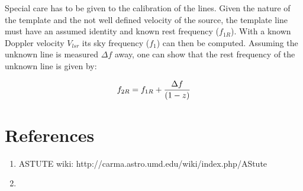 \documentclass[preprint]{aastex} %
\begin{document}
Special care has to be given to the calibration of the lines. Given the nature of
the template and the not well defined velocity of the source, the template line
must have an assumed identity and known rest frequency  ($f_{1R}$). 
With a known Doppler velocity $V_{lsr}$ its sky frequency ($f_1$) 
can then be computed.  Assuming the unknown line is measured ${\Delta f}$ away, one
can show that the rest frequency of the unknown line is given by:


$$
 f_{2R} = f_{1R} + {  {\Delta f} \over { (1-z) }}
$$

\section*{References}

\begin{enumerate}
\item
ASTUTE wiki:  http://carma.astro.umd.edu/wiki/index.php/AStute

\item

\end{enumerate}
\end{document}

